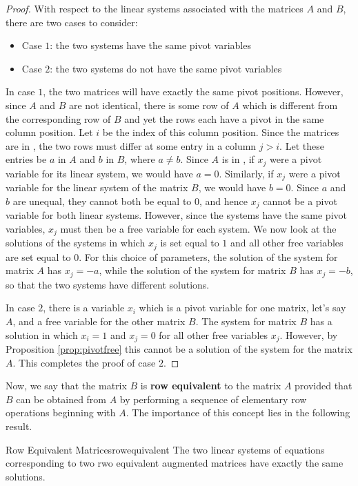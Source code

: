 \begin{proof}
With respect to the linear systems associated with the matrices $A$ and $B$, there are two cases to consider:
\begin{itemize}
\item Case $1$: the two systems have the same pivot variables
\item Case $2$: the two systems do not have the same pivot variables
\end{itemize}
In case $1$, the two matrices will have exactly the same pivot positions. However, since $A$ and $B$ are not identical, there is some row of $A$ which is different from the corresponding row of $B$ and yet the rows each have a pivot in the same column position. Let $i$ be the index of this column position. Since the matrices are in {\rref}, the two rows must differ at some entry in a column $j>i$. Let these entries be $a$ in $A$ and $b$ in $B$, where $a \neq b$. Since $A$ is in {\rref}, if $x_j$ were a pivot variable for its linear system, we would have $a=0$. Similarly, if $x_j$ were a pivot variable for the linear system of the matrix $B$, we would have $b=0$. Since $a$ and $b$ are unequal, they cannot both be equal to $0$, and hence $x_j$ cannot be a pivot variable for both linear systems. However, since the systems have the same pivot variables, $x_j$ must then be a free variable for each system. We now look at the solutions of the systems in which $x_j$ is set equal to $1$ and all other free variables are set equal to $0$. For this choice of parameters, the solution of the system for matrix $A$ has $x_j=-a$, while the solution of the system for matrix $B$ has $x_j=-b$, so that the two systems have different solutions.

In case $2$, there is a variable $x_i$ which is a pivot variable for one matrix, let's say $A$, and a free variable for the other matrix $B$. The system for matrix $B$ has a solution in which $x_i=1$ and $x_j=0$ for all other free variables $x_j$. However, by Proposition \ref{prop:pivotfree} this cannot be a solution of the system for the matrix $A$. This completes the proof of case $2$.
\end{proof}

Now, we say that the matrix $B$ is \textbf{row equivalent}  to the matrix $A$ provided that $B$ can be obtained from $A$ by performing a sequence of elementary row operations beginning with $A$. The importance of this concept lies in the following result.

\begin{theorem}{Row Equivalent Matrices}{rowequivalent}
The two linear systems of equations corresponding to two rwo equivalent augmented matrices have exactly the same solutions.
\end{theorem}

